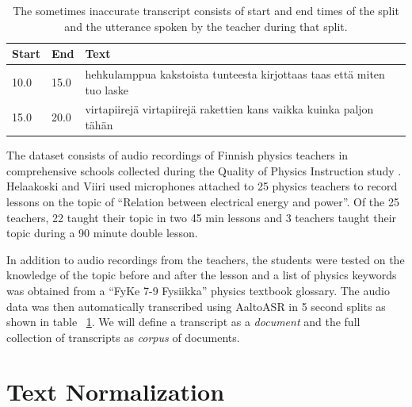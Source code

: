 \documentclass[utf8,english]{gradu3}
\begin{document}
\begin{table}[]
  \begin{tabular}{ | l | l | l |}
  \hline
  \textbf{Start} & \textbf{End}  & \textbf{Text} \\ \hline
  10.0 & 15.0 & hehkulamppua kakstoista tunteesta kirjottaas taas että miten tuo laske\\ \hline
  15.0 & 20.0 & virtapiirejä virtapiirejä rakettien kans vaikka kuinka paljon tähän\\
  \hline
  \end{tabular}
  \caption{The sometimes inaccurate transcript consists of start and end times of the split and the utterance spoken by the teacher during that split.}
  \label{table:transcript}
\end{table}


The dataset consists of audio recordings of Finnish physics teachers in comprehensive schools collected during the Quality of Physics Instruction study \parencite{fischerQualityInstructionPhysics2014,helaakoskiContentContentStructure2014}. Helaakoski and Viiri \parencite*{helaakoskiContentContentStructure2014} used microphones attached to 25 physics teachers to record lessons on the topic of \enquote{Relation between electrical energy and power}. Of the 25 teachers, 22 taught their topic in two 45 min lessons and 3 teachers taught their topic during a 90 minute double lesson. 

In addition to audio recordings from the teachers, the students were tested on the knowledge of the topic before and after the lesson and a list of physics keywords was obtained from a \enquote{FyKe 7-9 Fysiikka}\parencite{kangaskorteFyKeFysiikkaOPS2016} physics textbook glossary. The audio data was then automatically transcribed using AaltoASR in 5 second splits \parencite{hirsimakiImportanceHighOrderNGram2009} as shown in table ~\ref{table:transcript}. We will define a transcript as a \emph{document} and the full collection of transcripts as \emph{corpus} of documents.



\section{Text Normalization}
\end{document}
